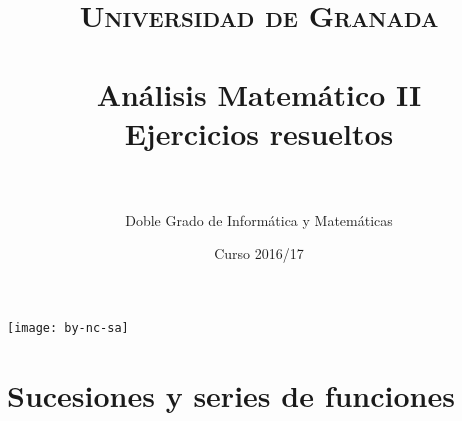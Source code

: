 \documentclass[11pt, a4paper]{article}
\title{
  \normalfont \normalsize 
  \textsc{Universidad de Granada} \\ [25pt]    %
  \horrule{0.5pt} \\[0.4cm] %
  \huge Análisis Matemático II\\ \Large{Ejercicios resueltos}\\ %
  \horrule{2pt} \\[0.5cm] %
}
\author{\Large{Doble Grado de Informática y Matemáticas}}
\date{\vspace{-1.5em} \normalsize Curso 2016/17}
\theoremstyle{theorem-style}
\theoremstyle{definition-style}
\theoremstyle{remark-style}
\theoremstyle{example-style}
\begin{document}
\maketitle  %
\vfill
\begin{center}
  \texttt{[image: by-nc-sa]}  %
\end{center}
\newpage
\tableofcontents    %
\newpage


\section{Sucesiones y series de funciones}
\end{document}
